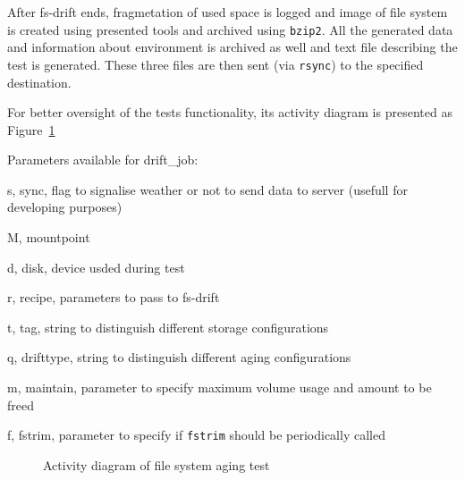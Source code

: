 \documentclass[
  color, %
  table, %
  lof,   %
  lot,   %
]{fithesis3}
\begin{document}
After fs-drift ends, fragmetation of used space is logged and image of file system is created using presented tools and archived using \texttt{bzip2}. All the generated data and information about environment is archived as well and text file describing the test is generated. These three files are then sent (via \texttt{rsync}) to the specified destination.

For better oversight of the tests functionality, its activity diagram is presented as Figure~\ref{fig:drift_job_activity}

Parameters available for drift\_job:
\begin{compactenum}
  \item s, sync, flag to signalise weather or not to send data to server (usefull for developing purposes)
  \item M, mountpoint
  \item d, disk, device usded during test
  \item r, recipe, parameters to pass to fs-drift
  \item t, tag, string to distinguish different storage configurations
  \item q, drifttype, string to distinguish different aging configurations
  \item m, maintain, parameter to specify maximum volume usage and amount to be freed
  \item f, fstrim, parameter to specify if \texttt{fstrim} should be periodically called
  \end{compactenum}


\begin{figure}[ht]
    \centering
    \caption{Activity diagram of file system aging test}
    \label{fig:drift_job_activity}
\end{figure}
\end{document}
